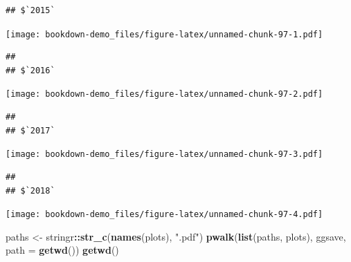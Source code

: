 \documentclass[]{book}
\newenvironment{Shaded}{\begin{snugshade}}{\end{snugshade}}
\newcommand{\KeywordTok}[1]{\textcolor[rgb]{0.13,0.29,0.53}{\textbf{#1}}}
\newcommand{\DataTypeTok}[1]{\textcolor[rgb]{0.13,0.29,0.53}{#1}}
\newcommand{\StringTok}[1]{\textcolor[rgb]{0.31,0.60,0.02}{#1}}
\newcommand{\CommentTok}[1]{\textcolor[rgb]{0.56,0.35,0.01}{\textit{#1}}}
\newcommand{\OperatorTok}[1]{\textcolor[rgb]{0.81,0.36,0.00}{\textbf{#1}}}
\newcommand{\NormalTok}[1]{#1}
\theoremstyle{definition}
\theoremstyle{definition}
\theoremstyle{definition}
\theoremstyle{remark}
\begin{document}
\begin{Shaded}
\end{Shaded}

\begin{verbatim}
## $`2015`
\end{verbatim}

\texttt{[image: bookdown-demo\_files/figure-latex/unnamed-chunk-97-1.pdf]}

\begin{verbatim}
## 
## $`2016`
\end{verbatim}

\texttt{[image: bookdown-demo\_files/figure-latex/unnamed-chunk-97-2.pdf]}

\begin{verbatim}
## 
## $`2017`
\end{verbatim}

\texttt{[image: bookdown-demo\_files/figure-latex/unnamed-chunk-97-3.pdf]}

\begin{verbatim}
## 
## $`2018`
\end{verbatim}

\texttt{[image: bookdown-demo\_files/figure-latex/unnamed-chunk-97-4.pdf]}

\begin{Shaded}
\begin{Highlighting}[]
\NormalTok{paths <-}\StringTok{ }\NormalTok{stringr}\OperatorTok{::}\KeywordTok{str_c}\NormalTok{(}\KeywordTok{names}\NormalTok{(plots), }\StringTok{".pdf"}\NormalTok{)}
\KeywordTok{pwalk}\NormalTok{(}\KeywordTok{list}\NormalTok{(paths, plots), ggsave, }\DataTypeTok{path =} \KeywordTok{getwd}\NormalTok{())}
\KeywordTok{getwd}\NormalTok{()}
\end{Highlighting}
\end{Shaded}
\end{document}
